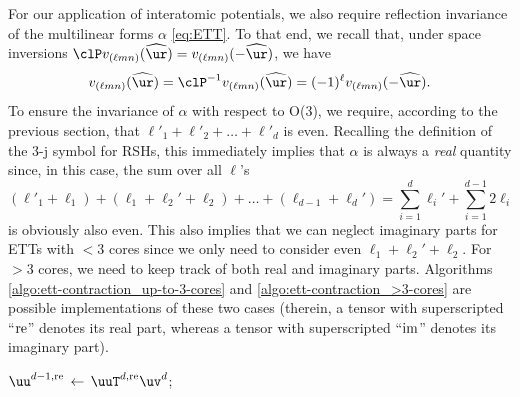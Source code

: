 For our application of interatomic potentials, we also require reflection invariance of the multilinear forms $\alpha$ \eqref{eq:ETT}.
To that end, we recall that, under space inversions $\clP v_{(\ell mn)}(\widehat\ur) = v_{(\ell mn)}(-\widehat\ur)$, we have
\begin{equation}
    v_{(\ell mn)}(\widehat\ur) = \clP^{-1} v_{(\ell mn)}(\widehat\ur) = (-1)^\ell v_{(\ell mn)}(-\widehat\ur).
\end{equation}
To ensure the invariance of $\alpha$ with respect to O(3), we require, according to the previous section, that $\ell'_1 + \ell'_2 + \ldots + \ell'_d$ is even.
Recalling the definition of the 3-j symbol for RSHs, this immediately implies that $\alpha$ is always a \emph{real} quantity since, in this case, the sum over all $\ell$'s
\begin{equation}
    (\ell'_1 + \ell_1) + (\ell_1 + \ell_2' + \ell_2) + \ldots + (\ell_{d-1} + \ell_d') = \sum_{i=1}^d \ell_i' + \sum_{i=1}^{d-1} 2\ell_i
\end{equation}
is obviously also even.
This also implies that we can neglect imaginary parts for ETTs with $<$3 cores since we only need to consider even $\ell_1 + \ell_2' + \ell_2$.
For $>$3 cores, we need to keep track of both real and imaginary parts.
Algorithms \ref{algo:ett-contraction_up-to-3-cores} and \ref{algo:ett-contraction_>3-cores} are possible implementations of these two cases (therein, a tensor with superscripted ``${\rm re}$'' denotes its real part, whereas a tensor with superscripted ``${\rm im}$'' denotes its imaginary part).

\begin{algorithm}[hbt]
    \LinesNumbered
    \caption{ETT contraction with three or less cores}
    \label{algo:ett-contraction_up-to-3-cores}
    $\uu^{d-1,{\rm re}} \,\leftarrow\, \uuT^{d,{\rm re}} \uv^d$; \\
\end{algorithm}

